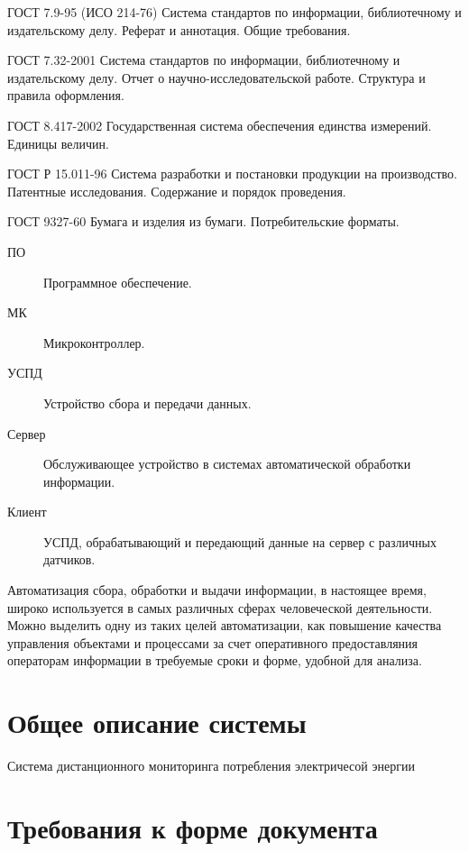\documentclass[utf8,14pt, coursreport]{G7-32}
\begin{document}
ГОСТ 7.9-95 (ИСО 214-76) Система стандартов по информации, библиотечному и издательскому делу. Реферат и аннотация. Общие требования.

ГОСТ 7.32-2001 Система стандартов по информации, библиотечному и издательскому делу. Отчет о научно-исследовательской работе. Структура и правила оформления.

ГОСТ 8.417-2002 Государственная система обеспечения единства измерений. Единицы величин.

ГОСТ Р 15.011-96 Система разработки и постановки продукции на производство. Патентные исследования. Содержание и порядок проведения.

ГОСТ 9327-60 Бумага и изделия из бумаги. Потребительские форматы.
\fi


\Abbreviations

\begin{description}
\item[ПО] Программное обеспечение.
\item[МК] Микроконтроллер.
\item[УСПД] Устройство сбора и передачи данных.
\item[Сервер] Обслуживающее устройство в системах автоматической обработки информации.
\item[Клиент] УСПД, обрабатывающий и передающий данные на сервер с различных датчиков.
\end{description}


\Introduction
Автоматизация сбора, обработки и выдачи информации, в настоящее время, широко используется в самых различных сферах человеческой деятельности. Можно выделить одну из таких целей автоматизации, как повышение качества управления объектами и процессами за счет оперативного предоставляния операторам информации в требуемые сроки и форме, удобной для анализа.

\mainmatter %

\chapter{\textbf{Общее описание системы}}


Система дистанционного мониторинга потребления электричесой энергии

\chapter{Требования к форме документа}
\end{document}
